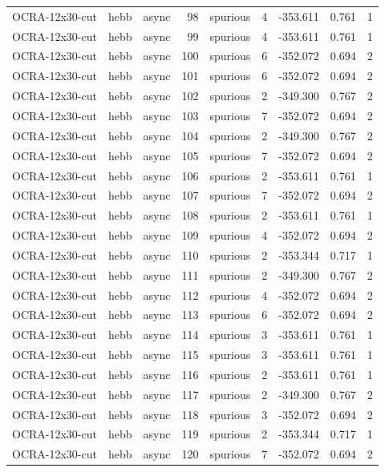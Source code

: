 \begin{tabular}{lllrlrrrr}
OCRA-12x30-cut & hebb & async & 98 & spurious & 4 & -353.611 & 0.761 & 1 \\
OCRA-12x30-cut & hebb & async & 99 & spurious & 4 & -353.611 & 0.761 & 1 \\
OCRA-12x30-cut & hebb & async & 100 & spurious & 6 & -352.072 & 0.694 & 2 \\
OCRA-12x30-cut & hebb & async & 101 & spurious & 6 & -352.072 & 0.694 & 2 \\
OCRA-12x30-cut & hebb & async & 102 & spurious & 2 & -349.300 & 0.767 & 2 \\
OCRA-12x30-cut & hebb & async & 103 & spurious & 7 & -352.072 & 0.694 & 2 \\
OCRA-12x30-cut & hebb & async & 104 & spurious & 2 & -349.300 & 0.767 & 2 \\
OCRA-12x30-cut & hebb & async & 105 & spurious & 7 & -352.072 & 0.694 & 2 \\
OCRA-12x30-cut & hebb & async & 106 & spurious & 2 & -353.611 & 0.761 & 1 \\
OCRA-12x30-cut & hebb & async & 107 & spurious & 7 & -352.072 & 0.694 & 2 \\
OCRA-12x30-cut & hebb & async & 108 & spurious & 2 & -353.611 & 0.761 & 1 \\
OCRA-12x30-cut & hebb & async & 109 & spurious & 4 & -352.072 & 0.694 & 2 \\
OCRA-12x30-cut & hebb & async & 110 & spurious & 2 & -353.344 & 0.717 & 1 \\
OCRA-12x30-cut & hebb & async & 111 & spurious & 2 & -349.300 & 0.767 & 2 \\
OCRA-12x30-cut & hebb & async & 112 & spurious & 4 & -352.072 & 0.694 & 2 \\
OCRA-12x30-cut & hebb & async & 113 & spurious & 6 & -352.072 & 0.694 & 2 \\
OCRA-12x30-cut & hebb & async & 114 & spurious & 3 & -353.611 & 0.761 & 1 \\
OCRA-12x30-cut & hebb & async & 115 & spurious & 3 & -353.611 & 0.761 & 1 \\
OCRA-12x30-cut & hebb & async & 116 & spurious & 2 & -353.611 & 0.761 & 1 \\
OCRA-12x30-cut & hebb & async & 117 & spurious & 2 & -349.300 & 0.767 & 2 \\
OCRA-12x30-cut & hebb & async & 118 & spurious & 3 & -352.072 & 0.694 & 2 \\
OCRA-12x30-cut & hebb & async & 119 & spurious & 2 & -353.344 & 0.717 & 1 \\
OCRA-12x30-cut & hebb & async & 120 & spurious & 7 & -352.072 & 0.694 & 2 \\

\end{tabular}
